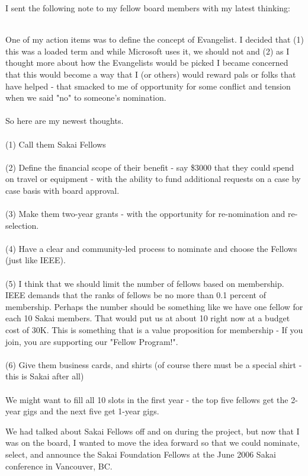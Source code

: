 \documentclass[12pt]{book}
\begin{document}
I sent the following note to my fellow board members
with my latest thinking:\\
\\
\begin{sf}
One of my action items was to define the concept of Evangelist.
I decided that (1) this was a loaded term and while Microsoft
uses it, we should not and (2) as I thought more about how the
Evangelists would be picked I became concerned that this would
become a way that I (or others) would reward pals or folks that
have helped - that smacked to me of opportunity for some
conflict and tension when we said "no" to someone's nomination.\\
\\
So here are my newest thoughts.\\
\\
(1) Call them Sakai Fellows\\
\\
(2) Define the financial scope of their benefit - say \$3000
that they could spend on travel or equipment  - with the ability
to fund additional requests on a case by case basis with board approval.\\
\\
(3) Make them two-year grants - with the opportunity for
re-nomination and re-selection.\\
\\
(4) Have a clear and community-led process to nominate and
choose the Fellows (just like IEEE).\\
\\
(5)  I think that we should limit the number of fellows based on
membership.   IEEE demands that the ranks of fellows be no more
than 0.1 percent of membership.  Perhaps the number should be
something like we have one fellow for each 10 Sakai members.
That would put us at about 10 right now at a budget cost of 30K.
This is something that is a value proposition for membership -
If you join, you are supporting our "Fellow Program!".\\
\\
(6) Give them business cards, and shirts (of course there must be
a special shirt - this is Sakai after all)\\
\\
We might want to fill all 10 slots in the first year - the top five
fellows get the 2-year gigs and the next five get 1-year gigs.\\
\end{sf}

We had talked about Sakai Fellows off and on during the project, but now that I was
on the board, I wanted to move the idea forward so that we could nominate,
select, and announce the Sakai Foundation Fellows at the June 2006
Sakai conference in Vancouver, BC.
\end{document}
